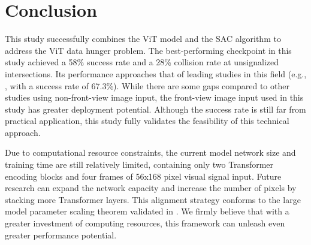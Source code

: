 
\section{Conclusion}
    This study successfully combines the ViT model and the SAC algorithm to address the ViT data hunger problem. The best-performing checkpoint in this study achieved a 58\% success rate and a 28\% collision rate at unsignalized intersections. Its performance approaches that of leading studies in this field (e.g., \cite{x_zhang_integrating_2025}, with a success rate of 67.3\%). While there are some gaps compared to other studies using non-front-view image input, the front-view image input used in this study has greater deployment potential. Although the success rate is still far from practical application, this study fully validates the feasibility of this technical approach.

    Due to computational resource constraints, the current model network size and training time are still relatively limited, containing only two Transformer encoding blocks and four frames of 56x168 pixel visual signal input. Future research can expand the network capacity and increase the number of pixels by stacking more Transformer layers. This alignment strategy conforms to the large model parameter scaling theorem validated in \cite{wu_rewarddance_2025}. We firmly believe that with a greater investment of computing resources, this framework can unleash even greater performance potential.
    